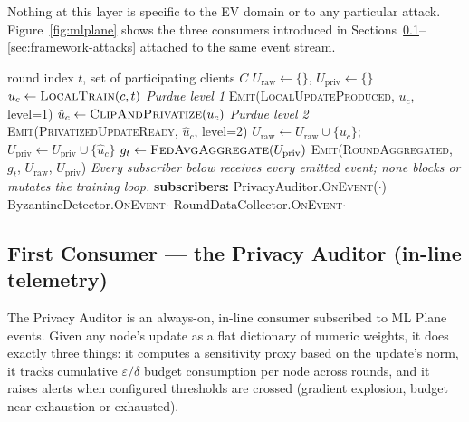 Nothing at this layer is specific to the EV domain or to any
particular attack. Figure~\ref{fig:mlplane} shows the three consumers
introduced in Sections~\ref{sec:framework-auditor}--\ref{sec:framework-attacks}
attached to the same event stream.

\begin{algorithm}[t]
\caption{ML Plane event dispatch (per training round)}
\label{alg:mlplane-dispatch}
\begin{algorithmic}[1]
\REQUIRE round index $t$, set of participating clients $C$
\STATE $U_{\text{raw}} \gets \{\}$, $U_{\text{priv}} \gets \{\}$
  \STATE $u_c \gets \textsc{LocalTrain}(c, t)$ \textit{Purdue level 1}
  \STATE \textsc{Emit}(\textsc{LocalUpdateProduced}, $u_c$, level=1)
  \STATE $\hat{u}_c \gets \textsc{ClipAndPrivatize}(u_c)$ \textit{Purdue level 2}
  \STATE \textsc{Emit}(\textsc{PrivatizedUpdateReady}, $\hat{u}_c$, level=2)
  \STATE $U_{\text{raw}} \gets U_{\text{raw}} \cup \{u_c\}$; \quad $U_{\text{priv}} \gets U_{\text{priv}} \cup \{\hat{u}_c\}$
\ENDFOR
\STATE $g_t \gets \textsc{FedAvgAggregate}(U_{\text{priv}})$
\STATE \textsc{Emit}(\textsc{RoundAggregated}, $g_t$, $U_{\text{raw}}$, $U_{\text{priv}}$)
\STATE \textit{Every subscriber below receives every emitted event; none blocks or mutates the training loop.}
\STATE \textbf{subscribers:} PrivacyAuditor.\textsc{OnEvent}($\cdot$) 
\STATE {} ByzantineDetector.\textsc{OnEvent}{$\cdot$} 
\STATE {} RoundDataCollector.\textsc{OnEvent}{$\cdot$} 
\end{algorithmic}
\end{algorithm}

\subsection{First Consumer --- the Privacy Auditor (in-line telemetry)}
\label{sec:framework-auditor}

The Privacy Auditor is an always-on, in-line consumer subscribed to ML
Plane events. Given any node's update as a flat dictionary of numeric
weights, it does exactly three things: it computes a sensitivity proxy
based on the update's norm, it tracks cumulative $\varepsilon/\delta$
budget consumption per node across rounds, and it raises alerts when
configured thresholds are crossed (gradient explosion, budget near
exhaustion or exhausted).

